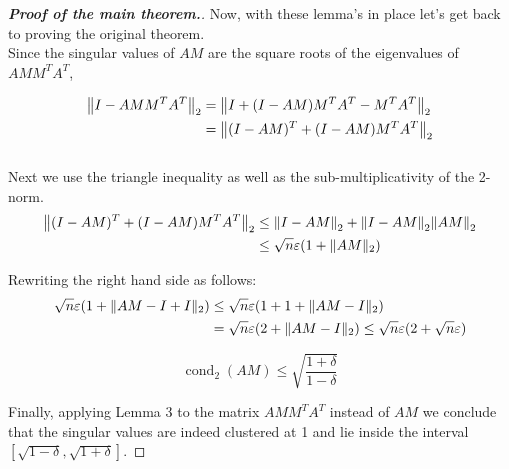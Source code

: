 \documentclass[paper=A4, fontsize=11pt]{scrartcl}
\let\originalleft\left
\let\originalright\right
\renewcommand{\left}{\mathopen{}\mathclose\bgroup\originalleft}
\renewcommand{\right}{\aftergroup\egroup\originalright}
\theoremstyle{remark}
\begin{document}
\vspace{2em}
\begin{proof}[\textbf{Proof of the main theorem.}] 

Now, with these lemma's in place let's get back to proving the original theorem. \\

Since the singular values of $AM$ are the square roots of the eigenvalues of $A M M^{T} A^{T} $, 


\begin{align}
\left\|I-A M M^{T} A^{T}\right\|_{2} &= \left\|I+(I-A M) M^{T} A^{T}-M^{T} A^{T}\right\|_{2} \\ & =\left\|(I-A M)^{T} + (I-A M)M^{T}A^{T}\right\|_{2}
\end{align}
\\
Next we use the triangle inequality as well as the sub-multiplicativity of the 2-norm.
\\
\begin{align}
\left\|(I-A M)^{T} + (I-A M)M^{T}A^{T}\right\|_{2}
& \leq \left\|I-A M\right\|_{2} + \left\|I-A M\right\|_{2}\left\|AM\right\|_{2} \\
& \leq \sqrt{n} \varepsilon\left(1+\|A M\|_{2}\right)
\end{align}

Rewriting the right hand side as follows: 
\begin{align}
\sqrt{n} \varepsilon\left(1+\|A M-I+I\|_{2}\right) &\leq \sqrt{n} \varepsilon\left(1+1+\|A M-I\|_{2}\right) \\
&= \sqrt{n} \varepsilon\left(2 +\|A M-I\|_{2}\right)  \leq \sqrt{n} \varepsilon(2+\sqrt{n} \varepsilon)
\end{align}

\begin{equation}
\operatorname{cond}_{2}(A M) \leq \sqrt{\frac{1+\delta}{1-\delta}}
\end{equation}

Finally, applying Lemma 3 to the matrix $ A M M^{T} A^{T} $ instead of $ A M$ we conclude that the singular values are indeed clustered at 1 and lie inside the interval \([\sqrt{1-\delta}, \sqrt{1+\delta}]\).
\end{proof}
\end{document}
